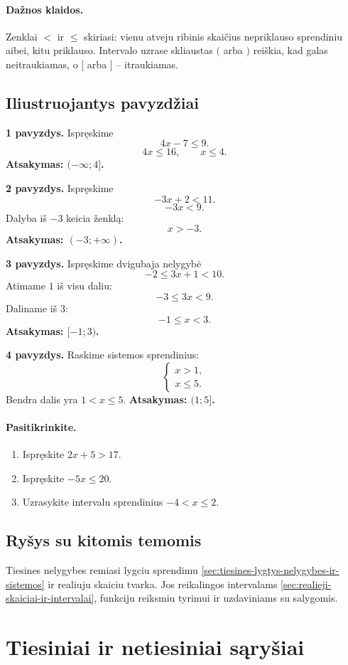 \paragraph{Dažnos klaidos.}
Zenklai $<$ ir $\le$ skiriasi: vienu atveju ribinis skaičius nepriklauso sprendiniu aibei, kitu priklauso. Intervalo uzrase skliaustas $($ arba $)$ reiškia, kad galas neitraukiamas, o $[$ arba $]$ -- itraukiamas.

\subsection{Iliustruojantys pavyzdžiai}
\textbf{1 pavyzdys.} Ispręskime
\[
4x-7\le9.
\]
\[
4x\le16,\qquad x\le4.
\]
\textbf{Atsakymas: $(-\infty;4]$.}

\textbf{2 pavyzdys.} Ispręskime
\[
-3x+2<11.
\]
\[
-3x<9.
\]
Dalyba iš $-3$ keicia ženklą:
\[
x>-3.
\]
\textbf{Atsakymas: $(-3;+\infty)$.}

\textbf{3 pavyzdys.} Ispręskime dvigubaja nelygybė
\[
-2\le 3x+1<10.
\]
Atimame $1$ iš visu daliu:
\[
-3\le3x<9.
\]
Daliname iš $3$:
\[
-1\le x<3.
\]
\textbf{Atsakymas: $[-1;3)$.}

\textbf{4 pavyzdys.} Raskime sistemos sprendinius:
\[
\begin{cases}
x>1,\\
x\le5.
\end{cases}
\]
Bendra dalis yra $1<x\le5$.
\textbf{Atsakymas: $(1;5]$.}

\paragraph{Pasitikrinkite.}
\begin{enumerate}[label=\alph*)]
\item Ispręskite $2x+5>17$.
\item Ispręskite $-5x\le20$.
\item Uzrasykite intervalu sprendinius $-4<x\le2$.
\end{enumerate}

\subsection{Ryšys su kitomis temomis}
Tiesines nelygybes remiasi lygciu sprendimu \ref{sec:tiesines-lygtys-nelygybes-ir-sistemos} ir realiuju skaiciu tvarka. Jos reikalingos intervalams \ref{sec:realieji-skaiciai-ir-intervalai}, funkciju reiksmiu tyrimui ir uzdaviniams su salygomis.

\section{Tiesiniai ir netiesiniai sąryšiai}\label{sec:tiesiniai-ir-netiesiniai-sarysiai-7-8}

